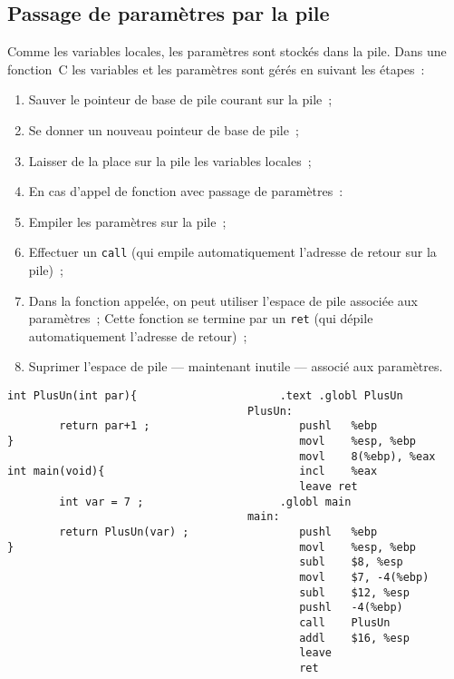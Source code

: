 \begin{frame}
  \section{Passage de param\`etres par la pile}%
        Comme les variables locales, les param\`etres sont stock\'es
        dans la pile. Dans une fonction~C les variables et 
        les param\`etres sont g\'er\'es en suivant les \'etapes~:
        \begin{enumerate}
        \item Sauver le pointeur de base de pile courant sur la pile~;
        \item Se donner un nouveau pointeur de base de pile~;
        \item Laisser de la place sur la pile les variables locales~;
        \item[] En cas d'appel de fonction avec passage de param\`etres~:
        \item Empiler les param\`etres sur la pile~;
        \item Effectuer un \texttt{call} (qui empile automatiquement
        l'adresse de retour sur la pile)~;
        \item[] Dans la fonction appel\'ee, on peut utiliser l'espace
        de pile associ\'ee aux param\`etres~;
         Cette fonction se termine par un \texttt{ret} (qui  
        d\'epile automatiquement l'adresse de retour)~;
        \item Suprimer l'espace de pile --- maintenant inutile --- 
        associ\'e aux param\`etres.
        \end{enumerate}
\newpage        
\begin{verbatim}
int PlusUn(int par){                      .text .globl PlusUn
                                     PlusUn:                                
        return par+1 ;                       pushl   %ebp                
}                                            movl    %esp, %ebp        
                                             movl    8(%ebp), %eax        
int main(void){                              incl    %eax                
                                             leave ret                        
        int var = 7 ;                     .globl main                        
                                     main:                                
        return PlusUn(var) ;                 pushl   %ebp                
}                                            movl    %esp, %ebp        
                                             subl    $8, %esp        
                                             movl    $7, -4(%ebp)        
                                             subl    $12, %esp        
                                             pushl   -4(%ebp)        
                                             call    PlusUn                
                                             addl    $16, %esp        
                                             leave
                                             ret                     
\end{verbatim}
\end{frame}
